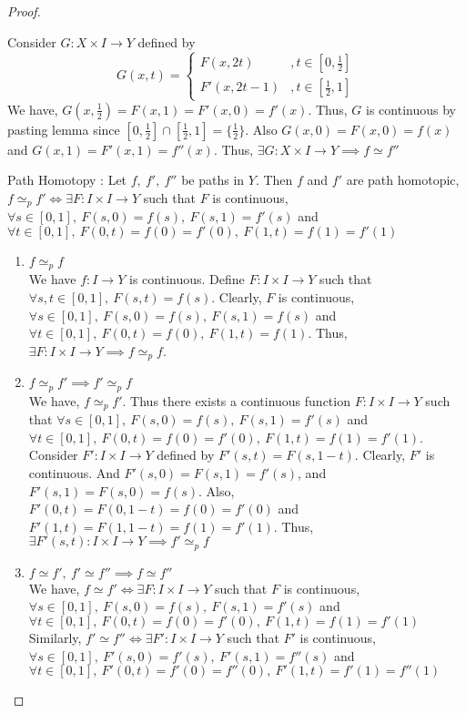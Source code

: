 \begin{proof}
\begin{enumerate}
			Consider $G:X \times I \to Y$ defined by \[ G(x,t) = \begin{cases} F(x,2t) & , t \in [0,\frac{1}{2}]\\ F'(x,2t-1) & , t \in [\frac{1}{2},1] \end{cases} \] We have, $G(x,\frac{1}{2}) = F(x,1) = F'(x,0) = f'(x)$. Thus, $G$ is continuous by pasting lemma since $[0,\frac{1}{2}] \cap [\frac{1}{2},1] = \{ \frac{1}{2}\}$. Also $G(x,0) = F(x,0) = f(x)$ and $G(x,1) = F'(x,1) = f''(x)$. Thus, $\exists G : X \times I \to Y \implies f \simeq f''$
	\end{enumerate}
	Path Homotopy : Let $f,\ f',\ f''$ be paths in $Y$. Then $f$ and $f'$ are path homotopic, $f \simeq_p f' \iff \exists F : I \times I \to Y$ such that $F$ is continuous, $\forall s \in [0,1],\ F(s,0)=f(s),\ F(s,1)=f'(s)$ and $\forall t \in [0,1],\ F(0,t)=f(0)=f'(0),\ F(1,t)=f(1)=f'(1)$
	\begin{enumerate}
		\item $f \simeq_p f$ \\
			We have $f : I \to Y$ is continuous. Define $F : I \times I \to Y$ such that $\forall s,t \in [0,1],\ F(s,t)=f(s)$. Clearly, $F$ is continuous, $\forall s \in [0,1],\ F(s,0) = f(s),\ F(s,1) = f(s)$ and $\forall t \in [0,1],\ F(0,t) = f(0),\ F(1,t) = f(1)$. Thus, $\exists F : I \times I \to Y \implies f \simeq_p f$.
		\item $f \simeq_p f' \implies f' \simeq_p f$\\
			We have, $f \simeq_p f'$. Thus there exists a continuous function $F : I \times I \to Y$ such that $\forall s \in [0,1],\ F(s,0) = f(s),\ F(s,1) = f'(s)$ and $\forall t \in [0,1],\ F(0,t)=f(0)=f'(0),\ F(1,t) = f(1) = f'(1)$.\\
			
			Consider $F' : I \times I \to Y$ defined by $F'(s,t) = F(s,1-t)$. Clearly, $F'$ is continuous. And $F'(s,0) = F(s,1) = f'(s)$, and $F'(s,1) = F(s,0) = f(s)$. Also, $F'(0,t) = F(0,1-t) = f(0) = f'(0)$ and $F'(1,t) = F(1,1-t) = f(1) = f'(1)$. Thus, $\exists F'(s,t) : I \times I \to Y \implies f' \simeq_p f$
		\item $f \simeq f',\ f' \simeq f'' \implies f \simeq f''$\\
			We have, $f \simeq f' \iff \exists F : I \times I \to Y$ such that $F$ is continuous, $\forall s \in [0,1],\ F(s,0)=f(s),\ F(s,1)=f'(s)$ and $\forall t \in [0,1],\ F(0,t)=f(0)=f'(0),\ F(1,t)=f(1)=f'(1)$\\
			
			Similarly, $f' \simeq f'' \iff \exists F' : I \times I \to Y$ such that $F'$ is continuous, $\forall s \in [0,1],\ F'(s,0)=f'(s),\ F'(s,1)=f''(s)$ and $\forall t \in [0,1],\ F'(0,t)=f'(0)=f''(0),\ F'(1,t)=f'(1)=f''(1)$\\


\end{enumerate}
\end{proof}
